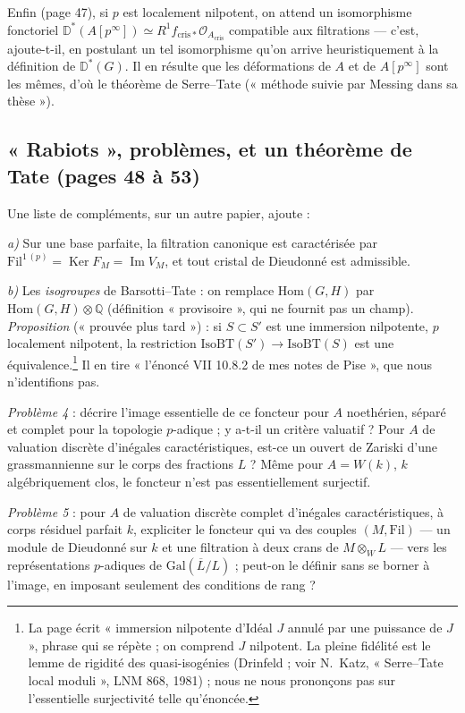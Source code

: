 \documentclass[11pt,a4paper]{article}
\begin{document}
Enfin (page 47), si $p$ est localement nilpotent, on attend un isomorphisme
fonctoriel $\mathbb{D}^*(A[p^\infty]) \simeq R^1 f_{\mathrm{cris}*}
\mathcal{O}_{A_{\mathrm{cris}}}$ compatible aux filtrations — c'est, ajoute-t-il,
en postulant un tel isomorphisme qu'on arrive heuristiquement à la
définition de $\mathbb{D}^*(G)$. Il en résulte que les déformations de $A$ et
de $A[p^\infty]$ sont les mêmes, d'où le théorème de Serre--Tate (« méthode
suivie par Messing dans sa thèse »).

\subsection*{« Rabiots », problèmes, et un théorème de Tate (pages 48 à 53)}

Une liste de compléments, sur un autre papier, ajoute :

\emph{a)} Sur une base parfaite, la filtration canonique est caractérisée par
$\mathrm{Fil}^{1\,(p)} = \operatorname{Ker} F_M = \operatorname{Im} V_M$, et tout
cristal de Dieudonné est admissible.

\emph{b)} Les \emph{isogroupes} de Barsotti--Tate : on remplace
$\mathrm{Hom}(G,H)$ par $\mathrm{Hom}(G,H) \otimes \mathbb{Q}$ (définition
« provisoire », qui ne fournit pas un champ). \emph{Proposition} (« prouvée
plus tard ») : si $S \subset S'$ est une immersion nilpotente, $p$ localement
nilpotent, la restriction $\mathrm{IsoBT}(S') \to \mathrm{IsoBT}(S)$ est une
équivalence.\footnote{La page écrit « immersion nilpotente d'Idéal $J$ annulé
par une puissance de $J$ », phrase qui se répète ; on comprend $J$ nilpotent.
La pleine fidélité est le lemme de rigidité des quasi-isogénies (Drinfeld ;
voir N.~Katz, « Serre--Tate local moduli », LNM 868, 1981) ; nous ne nous
prononçons pas sur l'essentielle surjectivité telle qu'énoncée.} Il en tire
« l'énoncé VII 10.8.2 de mes notes de Pise », que nous n'identifions pas.

\emph{Problème 4} : décrire l'image essentielle de ce foncteur pour $A$
noethérien, séparé et complet pour la topologie $p$-adique ; y a-t-il un
critère valuatif ? Pour $A$ de valuation discrète d'inégales
caractéristiques, est-ce un ouvert de Zariski d'une grassmannienne sur le
corps des fractions $L$ ? Même pour $A = W(k)$, $k$ algébriquement clos, le
foncteur n'est pas essentiellement surjectif.

\emph{Problème 5} : pour $A$ de valuation discrète complet d'inégales
caractéristiques, à corps résiduel parfait $k$, expliciter le foncteur qui va
des couples $(M, \mathrm{Fil})$ — un module de Dieudonné sur $k$ et une
filtration à deux crans de $M \otimes_W L$ — vers les représentations
$p$-adiques de $\mathrm{Gal}(\overline{L}/L)$ ; peut-on le définir sans se borner
à l'image, en imposant seulement des conditions de rang ?
\end{document}
